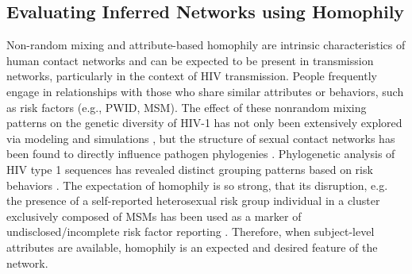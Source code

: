 \documentclass[utf8]{FrontiersinHarvard} %
\begin{document}



\subsection{Evaluating Inferred Networks using Homophily}

Non-random mixing and attribute-based homophily are intrinsic characteristics
of human contact networks and can be expected to be present in transmission networks,
particularly in the context of HIV transmission. People frequently engage in
relationships with those who share similar attributes or behaviors, such as
risk factors (e.g., PWID, MSM). The effect of these nonrandom mixing patterns
on the genetic diversity of HIV-1 has not only been extensively explored via
modeling and simulations \citep{goodreau_assessing_2006}, but the structure of
sexual contact networks has been found to directly influence pathogen
phylogenies \citep{robinson_how_2013}. Phylogenetic analysis of
HIV type 1 sequences has revealed distinct grouping patterns based on risk
behaviors \citep{holmes_molecular_1995}. The expectation of homophily is so strong, that its disruption, e.g. the presence of a self-reported heterosexual risk group individual in a cluster exclusively composed of MSMs has been used as a marker of undisclosed/incomplete risk factor reporting \cite{Ragonnet-Cronin:2018aa}. Therefore, when subject-level attributes are available, homophily is an expected and desired feature of the network. 
\end{document}
